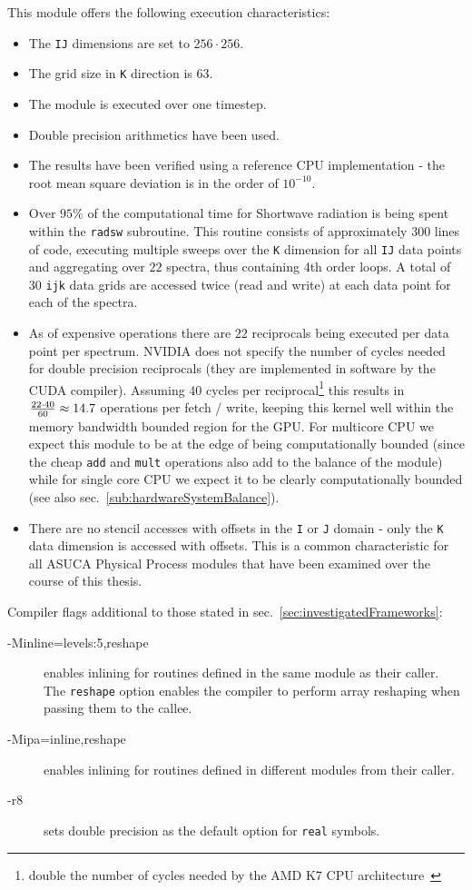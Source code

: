 This module offers the following execution characteristics:
\begin{itemize}
 \item The \verb|IJ| dimensions are set to $256 \cdot 256$.
 \item The grid size in \verb|K| direction is $63$.
 \item The module is executed over one timestep.
 \item Double precision arithmetics have been used.
 \item The results have been verified using a reference CPU implementation - the root mean square deviation is in the order of $10^{-10}$.
 \item Over $95\%$ of the computational time for Shortwave radiation is being spent within the \verb|radsw| subroutine. This routine consists of approximately $300$ lines of code, executing multiple sweeps over the \verb|K| dimension for all \verb|IJ| data points and aggregating over $22$ spectra, thus containing 4th order loops. A total of $30$ \verb|ijk| data grids are accessed twice (read and write) at each data point for each of the spectra.
 \item As of expensive operations there are $22$ reciprocals being executed per data point per spectrum. NVIDIA does not specify the number of cycles needed for double precision reciprocals (they are implemented in software by the CUDA compiler). Assuming 40 cycles  per reciprocal\footnote{double the number of cycles needed by the AMD K7 CPU architecture~\cite[p. 1]{fpDivision}} this results in ${{22 \cdot 40} \over 60} \approx 14.7$ operations per fetch / write, keeping this kernel well within the memory bandwidth bounded region for the GPU. For multicore CPU we expect this module to be at the edge of being computationally bounded (since the cheap \verb|add| and \verb|mult| operations also add to the balance of the module) while for single core CPU we expect it to be clearly computationally bounded (see also sec.~\ref{sub:hardwareSystemBalance}).
 \item There are no stencil accesses with offsets in the \verb|I| or \verb|J| domain - only the \verb|K| data dimension is accessed with offsets. This is a common characteristic for all ASUCA Physical Process modules that have been examined over the course of this thesis.
\end{itemize}

Compiler flags additional to those stated in sec.~\ref{sec:investigatedFrameworks}:
\begin{description}
 \item[-Minline=levels:5,reshape] enables inlining for routines defined in the same module as their caller. The \verb|reshape| option enables the compiler to perform array reshaping when passing them to the callee.
 \item[-Mipa=inline,reshape] enables inlining for routines defined in different modules from their caller.
 \item[-r8] sets double precision as the default option for \verb|real| symbols. 
\end{description}

